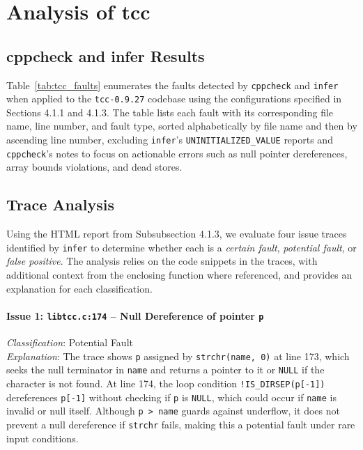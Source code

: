 \documentclass[conference]{IEEEtran}
\begin{document}
\section{Analysis of tcc}
\subsection{cppcheck and infer Results}
Table~\ref{tab:tcc_faults} enumerates the faults detected by \texttt{cppcheck} and \texttt{infer} when applied to the \texttt{tcc-0.9.27} codebase using the configurations specified in Sections 4.1.1 and 4.1.3. The table lists each fault with its corresponding file name, line number, and fault type, sorted alphabetically by file name and then by ascending line number, excluding \texttt{infer}'s \texttt{UNINITIALIZED\_VALUE} reports and \texttt{cppcheck}'s notes to focus on actionable errors such as null pointer dereferences, array bounds violations, and dead stores.

\subsection{Trace Analysis}
Using the HTML report from Subsubsection 4.1.3, we evaluate four issue traces identified by \texttt{infer} to determine whether each is a \textit{certain fault}, \textit{potential fault}, or \textit{false positive}. The analysis relies on the code snippets in the traces, with additional context from the enclosing function where referenced, and provides an explanation for each classification.

\paragraph{Issue 1: \texttt{libtcc.c:174} -- Null Dereference of pointer \texttt{p}}
\textit{Classification}: Potential Fault \\
\textit{Explanation}: The trace shows \texttt{p} assigned by \texttt{strchr(name, 0)} at line 173, which seeks the null terminator in \texttt{name} and returns a pointer to it or \texttt{NULL} if the character is not found. At line 174, the loop condition \texttt{!IS\_DIRSEP(p[-1])} dereferences \texttt{p[-1]} without checking if \texttt{p} is \texttt{NULL}, which could occur if \texttt{name} is invalid or null itself. Although \texttt{p > name} guards against underflow, it does not prevent a null dereference if \texttt{strchr} fails, making this a potential fault under rare input conditions.
\end{document}
